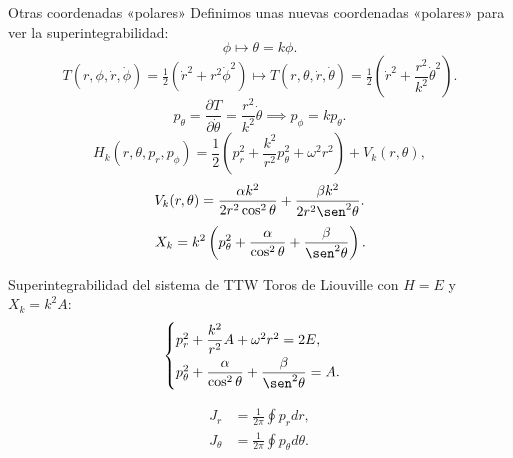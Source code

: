 \documentclass[aspectratio=169,mathserif]{beamer}
\begin{document}
  \begin{frame}{Otras coordenadas «polares»}
    Definimos unas nuevas coordenadas «polares» para ver la superintegrabilidad:
    \begin{equation*}
      \phi \longmapsto \theta=k\phi.
    \end{equation*}
    \pause
    \begin{equation*}
      T(r,\phi,\dot{r},\dot{\phi})=\tfrac{1}{2}(\dot{r}^2+r^2\dot{\phi}^2) \longmapsto T(r,\theta,\dot{r},\dot{\theta})=\tfrac{1}{2}\left(\dot{r}^2+\frac{r^2}{k^2}\dot{\theta}^2\right).
    \end{equation*}
    \pause
    \begin{equation*}
      p_\theta = \frac{\partial T}{\partial \dot{\theta}}=\frac{r^2}{k^2}\dot{\theta} \implies p_\phi = k p_\theta.
    \end{equation*}
    \pause
\begin{equation*}
  H_k(r,\theta,p_r,p_\phi)=\frac{1}{2}\left( p_r^2 + \frac{k^2}{r^2}p_\theta^2 + \omega^2 r^2 \right)+ V_k(r,\theta),
\end{equation*}
    \pause
\begin{equation*}
  V_{k}(r,\theta)=\frac{\alpha k^2}{2r^2 \cos^2 \theta} + \frac{\beta k^2}{2r^2 \sen^2 \theta}.
\end{equation*}
    \pause
\begin{equation*}
  X_k=k^2\left( p_\theta^2 +\frac{\alpha}{\cos^2 \theta}+ \frac{\beta}{\sen^2 \theta}   \right).
\end{equation*}
  \end{frame}
  
  \begin{frame}{Superintegrabilidad del sistema de TTW}
    Toros de Liouville con $H=E$ y $X_k=k^2 A$:
    \begin{equation*}
      \begin{cases}
	p_r^2 + \dfrac{k^2}{r^2}A + \omega^2 r^2 = 2E, \\[5 pt]
	p_\theta^2 + \dfrac{\alpha}{\cos^2 \theta}+ \dfrac{\beta}{\sen^2 \theta} = A.
      \end{cases}
    \end{equation*}
    \pause

    \begin{align*}
      J_r&=\frac{1}{2\pi}\oint p_r dr, \\
      J_\theta&=\frac{1}{2\pi}\oint p_\theta d\theta.
    \end{align*}
    
  \end{frame}
\end{document}
